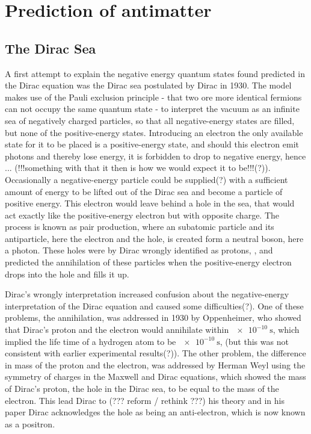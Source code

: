 \chapter{Prediction of antimatter}

\section{The Dirac Sea}
A first attempt to explain the negative energy quantum states found predicted in the Dirac equation was the Dirac sea postulated by Dirac in 1930. The model makes use of the Pauli exclusion principle - that two ore more identical fermions can not occupy the same quantum state - to interpret the vacuum as an infinite sea of negatively charged particles, so that all negative-energy states are filled, but none of the positive-energy states.\cite{bian_deduction_2016} Introducing an electron the only available state for it to be placed is a positive-energy state, and should this electron emit photons and thereby lose energy, it is forbidden to drop to negative energy, hence ... (!!!something with that it then is how we would expect it to be!!!(?)). Occasionally a negative-energy particle could be supplied(?) with a sufficient amount of energy to be lifted out of the Dirac sea and become a particle of positive energy. This electron would leave behind a hole in the sea, that would act exactly like the positive-energy electron but with opposite charge. The process is known as pair production, where an subatomic particle and its antiparticle, here the electron and the hole, is created form a neutral boson, here a photon. These holes were by Dirac wrongly identified as protons, \cite[p.~363]{dirac_theory_1930}, and predicted the annihilation of these particles when the positive-energy electron drops into the hole and fills it up.

Dirac's wrongly interpretation increased confusion about the negative-energy interpretation of the Dirac equation and caused some difficulties(?). One of these problems, the annihilation, was addressed in 1930 by Oppenheimer, who showed that Dirac's proton and the electron would annihilate within $\SI{e-10}{\second}$, which implied the life time of a hydrogen atom to be $\SI{e-10}{\second}$, (but this was not consistent with earlier experimental results(?)). The other problem, the difference in mass of the proton and the electron, was addressed by Herman Weyl using the symmetry of charges in the Maxwell and Dirac equations, which showed the mass of Dirac's proton, the hole in the Dirac sea, to be equal to the mass of the electron.\cite[sec.~8]{rajasekaran_discovery_2003} This lead Dirac to (??? reform / rethink ???) his theory and in his paper \cite[p.~61]{dirac_quantised_1931} Dirac acknowledges the hole as being an anti-electron, which is now known as a positron.

